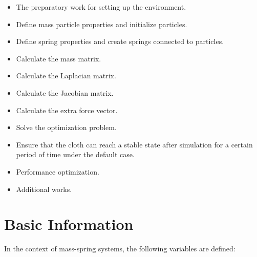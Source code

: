 \documentclass[acmtog]{acmart}
\begin{document}
\begin{itemize}
\item The preparatory work for setting up the environment.
\item Define mass particle properties and initialize particles.
\item Define spring properties and create springs connected to particles.
\item Calculate the mass matrix.
\item Calculate the Laplacian matrix.
\item Calculate the Jacobian matrix.
\item Calculate the extra force vector.
\item Solve the optimization problem.
\item Ensure that the cloth can reach a stable state after simulation for a certain period of time under the default case.
\item Performance optimization.
\item Additional works.
\end{itemize}

\section{Basic Information}

In the context of mass-spring systems, the following variables are defined:
\end{document}
